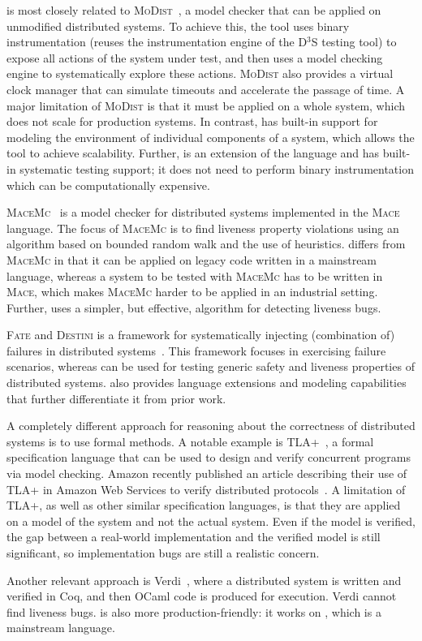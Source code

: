 \psharp is most closely related to \textsc{MoDist}~\cite{yang2009modist}, a model checker that can be applied on unmodified distributed systems. To achieve this, the tool uses binary instrumentation (reuses the instrumentation engine of the D$^3$S testing tool) to expose all actions of the system under test, and then uses a model checking engine to systematically explore these actions. \textsc{MoDist} also provides a virtual clock manager that can simulate timeouts and accelerate the passage of time. A major limitation of \textsc{MoDist} is that it must be applied on a whole system, which does not scale for production systems. In contrast, \psharp has built-in support for modeling the environment of individual components of a system, which allows the tool to achieve scalability. Further, \psharp is an extension of the \csharp language and has built-in systematic testing support; it does not need to perform binary instrumentation which can be computationally expensive.

\textsc{MaceMc}~\cite{killian2007life} is a model checker for distributed systems implemented in the \textsc{Mace} language. The focus of \textsc{MaceMc} is to find liveness property violations using an algorithm based on bounded random walk and the use of heuristics. \psharp differs from \textsc{MaceMc} in that it can be applied on legacy code written in a mainstream language, whereas a system to be tested with \textsc{MaceMc} has to be written in \textsc{Mace}, which makes \textsc{MaceMc} harder to be applied in an industrial setting. Further, \psharp uses a simpler, but effective, algorithm for detecting liveness bugs.

\textsc{Fate} and \textsc{Destini} is a framework for systematically injecting (combination of) failures in distributed systems~\cite{gunawi2011fate}. This framework focuses in exercising failure scenarios, whereas \psharp can be used for testing generic safety and liveness properties of distributed systems. \psharp also provides language extensions and modeling capabilities that further differentiate it from prior work.

A completely different approach for reasoning about the correctness of distributed systems is to use formal methods.  A notable example is TLA+~\cite{lamport1994temporal}, a formal specification language that can be used to design and verify concurrent programs via model checking. Amazon recently published an article describing their use of TLA+ in Amazon Web Services to verify distributed protocols~\cite{newcombe2015aws}. A limitation of TLA+, as well as other similar specification languages, is that they are applied on a model of the system and not the actual system. Even if the model is verified, the gap between a real-world implementation and the verified model is still significant, so implementation bugs are still a realistic concern.

Another relevant approach is Verdi~\cite{wilcox2015verdi}, where a distributed system is written and verified in Coq, and then OCaml code is produced for execution. Verdi cannot find liveness bugs. \psharp is also more production-friendly: it works on \csharp, which is a mainstream language.
